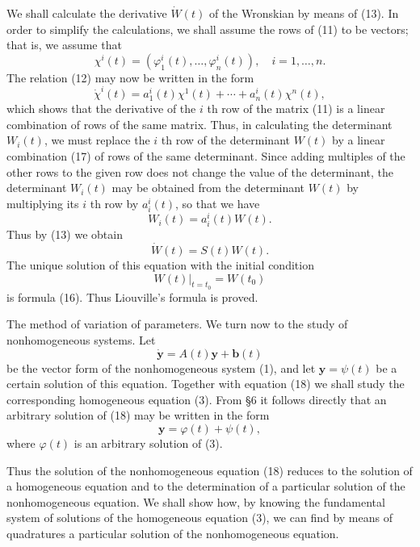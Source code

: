 \documentclass[10pt,a5paper]{book}
\theoremstyle{plain}
\theoremstyle{definition}
\theoremstyle{remark}
\begin{document}
We shall calculate the derivative $\dot{W}(t)$ of the Wronskian by means of (13). In order to simplify the calculations, we shall assume the rows of (11) to be vectors; that is, we assume that
\[
\chi^{i}(t)=\left(\varphi_{1}^{i}(t), \ldots, \varphi_{n}^{i}(t)\right), \quad i=1, \ldots, n .
\]
The relation (12) may now be written in the form
\begin{equation*}
\dot{\chi}^{i}(t)=a_{1}^{i}(t) \chi^{1}(t)+\cdots+a_{n}^{i}(t) \chi^{n}(t), \tag{17}
\end{equation*}
which shows that the derivative of the $i$ th row of the matrix (11) is a linear combination of rows of the same matrix. Thus, in calculating the determinant $W_{i}(t)$, we must replace the $i$ th row of the determinant $W(t)$ by a linear combination (17) of rows of the same determinant. Since adding multiples of the other rows to the given row does not change the value of the determinant, the determinant $W_{i}(t)$ may be obtained from the determinant $W(t)$ by multiplying its $i$ th row by $a_{i}^{i}(t)$, so that we have
\[
W_{i}(t)=a_{i}^{i}(t) W(t) .
\]
Thus by (13) we obtain
\[
\dot{W}(t)=S(t) W(t) .
\]
The unique solution of this equation with the initial condition
\[
\left.W(t)\right|_{t=t_{0}}=W\left(t_{0}\right)
\]
is formula (16). Thus Liouville's formula is proved.

The method of variation of parameters. We turn now to the study of nonhomogeneous systems. Let
\begin{equation*}
\dot{\mathbf{y}}=A(t) \mathbf{y}+\mathbf{b}(t) \tag{18}
\end{equation*}
be the vector form of the nonhomogeneous system (1), and let $\mathbf{y}=\psi(t)$ be a certain solution of this equation. Together with equation (18) we shall study the corresponding homogeneous equation (3). From §6 it follows directly that an arbitrary solution of (18) may be written in the form
\[
\mathbf{y}=\varphi(t)+\psi(t),
\]
where $\varphi(t)$ is an arbitrary solution of (3).

Thus the solution of the nonhomogeneous equation (18) reduces to the solution of a homogeneous equation and to the determination of a particular solution of the nonhomogeneous equation. We shall show how, by knowing the fundamental system of solutions of the homogeneous equation (3), we can find by means of quadratures a particular solution of the nonhomogeneous equation.
\end{document}
